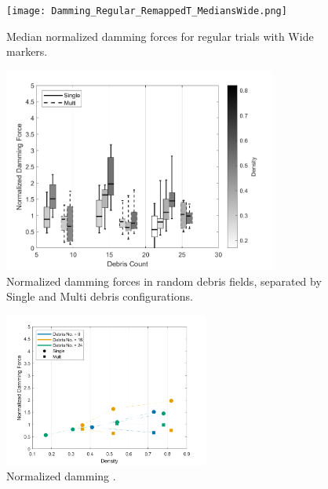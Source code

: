 \documentclass{article}
\begin{document}
\begin{figure}[htbp]
    \centering
    \texttt{[image: Damming\_Regular\_RemappedT\_MediansWide.png]}
    \caption{Median normalized damming forces for regular trials with Wide markers.}
    \label{fig:damming_medians_wide}
\end{figure}


\begin{figure}[htbp]
    \centering
    \includegraphics[width=0.8\textwidth]{Damming_Random_Single_vs_Multi_ByDensityGradient.png}
    \caption{Normalized damming forces in random debris fields, separated by Single and Multi debris configurations.}
    \label{fig:random_damming_gradient}
\end{figure}
\begin{figure}[htbp]
    \centering
    \includegraphics[width=0.6\textwidth]{figures/Damming_Peaks_densities_combined.png}
    \caption{Normalized damming .}
    \label{fig:damming_peaks}
\end{figure}
\end{document}
